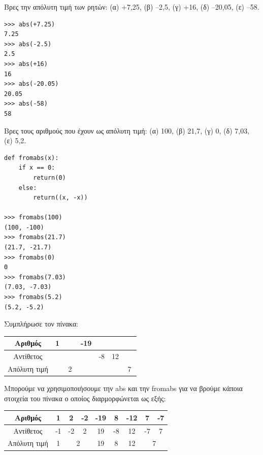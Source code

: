 \begin{exercise}
 Βρες την απόλυτη τιμή των ρητών: (α) +7,25, (β) –2,5, (γ) +16, (δ) –20,05, (ε) –58.
\end{exercise}
\begin{lstlisting}
>>> abs(+7.25)
7.25
>>> abs(-2.5)
2.5
>>> abs(+16)
16
>>> abs(-20.05)
20.05
>>> abs(-58)
58
\end{lstlisting}
\begin{exercise}
Βρες τους αριθμούς που έχουν ως απόλυτη τιμή: (α) 100, (β) 21,7, (γ) 0, (δ) 7,03, (ε) 5,2.
\end{exercise}
\begin{lstlisting}
def fromabs(x):
    if x == 0:
        return(0)
    else:
        return((x, -x))

>>> fromabs(100)
(100, -100)
>>> fromabs(21.7)
(21.7, -21.7)
>>> fromabs(0)
0
>>> fromabs(7.03)
(7.03, -7.03)
>>> fromabs(5.2)
(5.2, -5.2)
\end{lstlisting}
\begin{exercise}
Συμπλήρωσε τον πίνακα:
\begin{table}[h]
\begin{tabular}{|c|c|c|c|c|c|c|c|c|}
\hline
Αριθμός      &1&           &         &-19&   &    & & \\\hline
Αντίθετος    & &           &         &   & -8& 12 & & \\\hline
Απόλυτη τιμή & &\multicolumn{2}{c}{2}&   &   &    &\multicolumn{2}{c}{7}\\\hline
\end{tabular}
\end{table}
\end{exercise}
Μπορούμε να χρησιμοποιήσουμε την abs και την fromabs για να βρούμε κάποια στοιχεία του πίνακα ο οποίος διαρμορφώνεται ως εξής:
\begin{table}[h]
\begin{tabular}{|c|c|c|c|c|c|c|c|c|}
\hline
Αριθμός      &1 &   2       &    -2   &-19& 8 & -12& 7&-7\\\hline
Αντίθετος    &-1&  -2       &     2   &19 & -8& 12 &-7& 7\\\hline
Απόλυτη τιμή &1 &\multicolumn{2}{c}{2}& 19& 8 & 12 &\multicolumn{2}{c}{7}\\\hline
\end{tabular}
\end{table}


